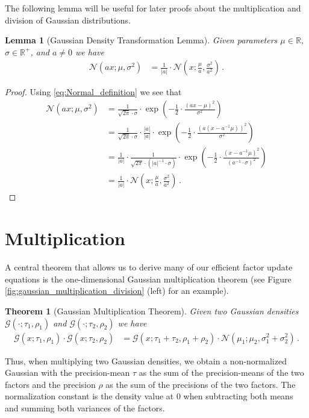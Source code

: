 \documentclass[a4paper]{article}
\newcommand{\Real}{{\mathbb R}}
\newcommand{\Normal}[3]{{\mathcal N} \left({#1};{#2},{#3}\right)}
\newcommand{\Gauss}[3]{{\mathcal G} \left({#1};{#2},{#3}\right)}
\newtheorem{theorem}{Theorem}
\newtheorem{lemma}{Lemma}
\theoremstyle{definition}
\begin{document}
The following lemma will be useful for later proofs about the multiplication and division of Gaussian distributions.
\begin{lemma}[Gaussian Density Transformation Lemma] \label{lem:gaussian_density_transformation}
    Given parameters $\mu \in \Real$, $\sigma \in \Real^+$, and $a \not= 0$ we have
    \begin{align}
        \Normal{ax}{\mu}{\sigma^2} & = \frac{1}{|a|}\cdot\Normal{x}{\frac{\mu}{a}}{\frac{\sigma^2}{a^2}}\,.
    \end{align}
\end{lemma}
\begin{proof}
    Using \eqref{eq:Normal_definition} we see that
    \begin{align*}
        \Normal{ax}{\mu}{\sigma^2} 
        & = \frac{1}{\sqrt{2\pi}\cdot \sigma} \cdot \exp\left( -\frac{1}{2} \cdot \frac{\left( ax - \mu \right)^2}{\sigma^2} \right) \\
        & = \frac{1}{\sqrt{2\pi}\cdot \sigma} \cdot \frac{|a|}{|a|} \cdot \exp\left( -\frac{1}{2} \cdot \frac{\left( a\left(x - a^{-1}\mu \right) \right)^2}{\sigma^2} \right) \\
        & = \frac{1}{|a|} \cdot \frac{1}{\sqrt{2\pi}\cdot \left( |a|^{-1} \cdot \sigma \right)} \cdot \exp\left( -\frac{1}{2} \cdot \frac{\left( x - a^{-1}\mu \right)^2}{\left( a^{-1}\cdot \sigma \right)^2} \right) \\
        & = \frac{1}{|a|}\cdot\Normal{x}{\frac{\mu}{a}}{\frac{\sigma^2}{a^2}}\,.
    \end{align*}
\end{proof}

\section*{Multiplication}
A central theorem that allows us to derive many of our efficient factor update equations is the one-dimensional Gaussian multiplication theorem (see Figure \ref{fig:gaussian_multiplication_division} (left) for an example).
\begin{theorem}[Gaussian Multiplication Theorem] \label{thm:gaussian_multiplication}
    Given two Gaussian densities $\Gauss{\cdot}{\tau_1}{\rho_1}$ and $\Gauss{\cdot}{\tau_2}{\rho_2}$ we have
    \begin{align}
        \Gauss{x}{\tau_1}{\rho_1} \cdot \Gauss{x}{\tau_2}{\rho_2} & = \Gauss{x}{\tau_1 + \tau_2}{\rho_1 + \rho_2} \cdot \Normal{\mu_1}{\mu_2}{\sigma_1^2 + \sigma_2^2}\,.
    \end{align}
\end{theorem}
Thus, when multiplying two Gaussian densities, we obtain a non-normalized Gaussian with the precision-mean $\tau$ as the sum of the precision-means of the two factors and the precision $\rho$ as the sum of the precisions of the two factors. The normalization constant is the density value at $0$ when subtracting both means and summing both variances of the factors. 
\end{document}

